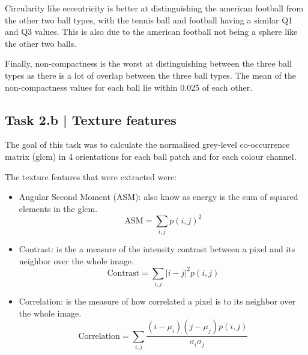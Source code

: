 \documentclass[conference]{IEEEtran}
\begin{document}
        Circularity like eccentricity is better at distinguishing the american football from the other two ball types, with the tennis ball and football having a similar Q1 and Q3 values.
        This is also due to the american football not being a sphere like the other two balls.

        Finally, non-compactness is the worst at distinguishing between the three ball types as there is a lot of overlap between the three ball types.
        The mean of the non-compactness values for each ball lie within 0.025 of each other.

    \subsection*{Task 2.b | Texture features}
        The goal of this task was to calculate the normalised grey-level co-occurrence matrix (glcm) in 4 orientations for each ball patch 
        and for each colour channel.

        The texture features that were extracted were:
        \begin{itemize}
            \item Angular Second Moment (ASM): also know as energy is the sum of squared elements in the glcm.\@
                \begin{equation}
                    \text{ASM} = \sum_{i,j} {p(i,j)}^2
                \end{equation}
            \item Contrast: is the a measure of the intensity contrast between a pixel and its neighbor over the whole image.
                \begin{equation}
                    \text{Contrast} = \sum_{i,j} |i-j|^2 p(i,j)
                \end{equation}
            \item Correlation: is the measure of how correlated a pixel is to its neighbor over the whole image.
                \begin{equation}
                    \text{Correlation} = \sum_{i,j} \frac{(i-\mu_i)(j-\mu_j)p(i,j)}{\sigma_i \sigma_j}
                \end{equation}
        \end{itemize}
\end{document}
